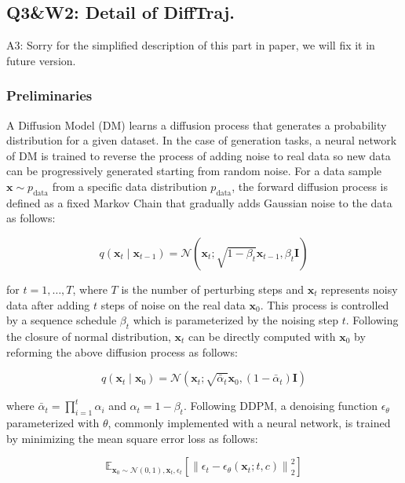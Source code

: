 \documentclass{article}
\begin{document}
\subsection{Q3\&W2: Detail of DiffTraj.}\label{q3w2-detail-of-difftraj.}

A3: Sorry for the simplified description of this part in paper, we will fix it in future version.

\subsubsection{Preliminaries}\label{preliminaries}

A Diffusion Model (DM) learns a diffusion process that generates a probability distribution for a given dataset. In the case of generation tasks, a neural network of DM is trained to reverse the process of adding noise to real data so new data can be progressively generated starting from random noise. For a data sample \(\mathbf{x} \sim p_{\text{data}}\) from a specific data distribution \(p_{\text{data}}\), the forward diffusion process is defined as a fixed Markov Chain that gradually adds Gaussian noise to the data as follows:

\[
q(\mathbf{x}_t \mid \mathbf{x}_{t-1}) = \mathcal{N}(\mathbf{x}_t; \sqrt{1 - \beta_t}\mathbf{x}_{t-1}, \beta_t\mathbf{I})
\]

for \(t = 1, \ldots, T\), where \(T\) is the number of perturbing steps and \(\mathbf{x}_t\) represents noisy data after adding \(t\) steps of noise on the real data \(\mathbf{x}_0\). This process is controlled by a sequence schedule \(\beta_t\) which is parameterized by the noising step \(t\). Following the closure of normal distribution, \(\mathbf{x}_t\) can be directly computed with \(\mathbf{x}_0\) by reforming the above diffusion process as follows:

\[
q(\mathbf{x}_t \mid \mathbf{x}_0) = \mathcal{N}(\mathbf{x}_t; \sqrt{\bar{\alpha}_t}\mathbf{x}_0, (1 - \bar{\alpha}_t)\mathbf{I})
\]

where \(\bar{\alpha}_t = \prod_{i=1}^t \alpha_i\) and \(\alpha_t = 1 - \beta_t\). Following DDPM, a denoising function \(\epsilon_\theta\) parameterized with \(\theta\), commonly implemented with a neural network, is trained by minimizing the mean square error loss as follows:

\[
\mathbb{E}_{\mathbf{x}_0 \sim \mathcal{N}(0,1), \mathbf{x}_t, \epsilon_t}\left[ \left\| \epsilon_t - \epsilon_\theta(\mathbf{x}_t; t, c) \right\|_2^2 \right] 
\]
\end{document}
